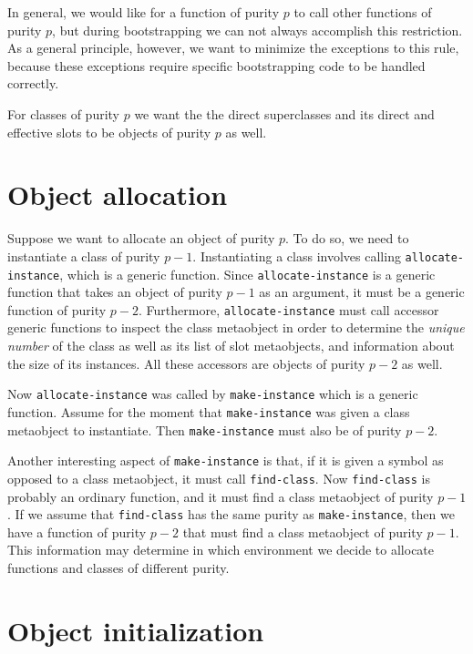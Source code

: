 In general, we would like for a function of purity $p$ to call other
functions of purity $p$, but during bootstrapping we can not always
accomplish this restriction.  As a general principle, however, we want
to minimize the exceptions to this rule, because these exceptions
require specific bootstrapping code to be handled correctly.

For classes of purity $p$ we want the the direct superclasses and its
direct and effective slots to be objects of purity $p$ as well.

\section{Object allocation}
\label{sec-app-bootstrapping-object-allocation}

Suppose we want to allocate an object of purity $p$.  To do so, we
need to instantiate a class of purity $p-1$.  Instantiating a class
involves calling \texttt{allocate-instance}, which is a generic
function.  Since \texttt{allocate-instance} is a generic function that
takes an object of purity $p-1$ as an argument, it must be a generic
function of purity $p-2$.  Furthermore, \texttt{allocate-instance}
must call accessor generic functions to inspect the class metaobject
in order to determine the \emph{unique number} of the class as well as
its list of slot metaobjects, and information about the size of its
instances.  All these accessors are objects of purity $p-2$ as well.

Now \texttt{allocate-instance} was called by \texttt{make-instance}
which is a generic function.  Assume for the moment that
\texttt{make-instance} was given a class metaobject to instantiate.
Then \texttt{make-instance} must also be of purity $p-2$.

Another interesting aspect of \texttt{make-instance} is that, if it is
given a symbol as opposed to a class metaobject, it must call
\texttt{find-class}.  Now \texttt{find-class} is probably an ordinary
function, and it must find a class metaobject of purity $p-1$.  If we
assume that \texttt{find-class} has the same purity as
\texttt{make-instance}, then we have a function of purity $p-2$ that
must find a class metaobject of purity $p-1$.  This information may
determine in which environment we decide to allocate functions and
classes of different purity.

\section{Object initialization}

